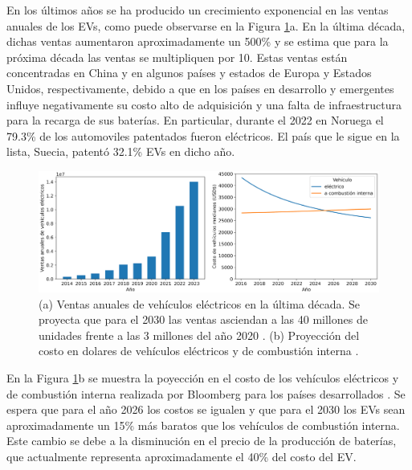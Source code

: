 En los últimos años se ha producido un crecimiento exponencial en las ventas 
anuales de los EVs, como puede observarse en la Figura \ref{fig:evs}a. En la
última década, dichas ventas aumentaron aproximadamente un 500\% y se estima que
para la próxima década las ventas se multipliquen por 10. Estas ventas están 
concentradas en China y en algunos países y estados de Europa y Estados Unidos, 
respectivamente, debido a que en los países en desarrollo y emergentes influye 
negativamente su costo alto de adquisición y una falta de infraestructura para la 
recarga de sus baterías. En particular, durante el 2022 en Noruega el 79.3\% de 
los automoviles patentados fueron eléctricos. El país que le sigue en la lista,
Suecia, patentó 32.1\% EVs en dicho año.
\begin{figure}[h!]
    \centering
    \includegraphics[width=\textwidth]{Introduccion/energia/evs.png}
    \caption{(a) Ventas anuales de vehículos eléctricos en la última década. Se 
    proyecta que para el 2030 las ventas asciendan a las 40 millones de unidades 
    frente a las 3 millones del año 2020 \cite{EVV}. (b) Proyección del costo en 
    dolares de vehículos eléctricos y de combustión interna \cite{BLOOMBERG}.}
    \label{fig:evs}
\end{figure}

En la Figura \ref{fig:evs}b se muestra la poyección en el costo de los vehículos 
eléctricos y de combustión interna realizada por Bloomberg para los países 
desarrollados \cite{BLOOMBERG}. Se espera que para el año 2026 los costos se 
igualen y que para el 2030 los EVs sean aproximadamente un 15\% más baratos que 
los vehículos de combustión interna. Este cambio se debe a la disminución en el
precio de la producción de baterías, que actualmente representa aproximadamente 
el 40\% del costo del EV.

